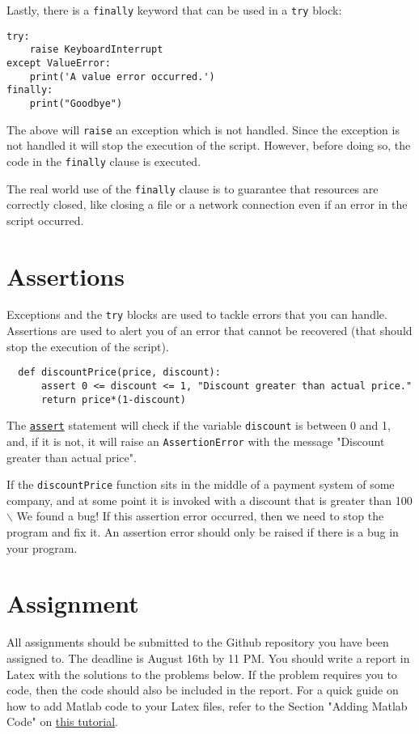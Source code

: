 \documentclass[12pt, a4paper]{article}
\begin{document}
Lastly, there is a \texttt{finally} keyword that can be used in a \texttt{try} block:
\lstset{language=jupyter-python,label= ,caption= ,captionpos=b,numbers=none}
\begin{lstlisting}
try:
    raise KeyboardInterrupt
except ValueError:
    print('A value error occurred.')
finally:
    print("Goodbye")
\end{lstlisting}

The above will \texttt{raise} an exception which is not handled.
Since the exception is not handled it will stop the execution of the script.
However, before doing so, the code in the \texttt{finally} clause is executed.

The real world use of the \texttt{finally} clause is to guarantee that resources are correctly closed, like closing a file or a network connection even if an error in the script occurred.
\section{Assertions}
\label{sec:org393f5d4}
Exceptions and the \texttt{try} blocks are used to tackle errors that you can handle.
Assertions are used to alert you of an error that cannot be recovered (that should stop the execution of the script).
\lstset{language=Python,label= ,caption= ,captionpos=b,numbers=none}
\begin{lstlisting}
  def discountPrice(price, discount):
      assert 0 <= discount <= 1, "Discount greater than actual price."
      return price*(1-discount)
\end{lstlisting}
The \href{https://docs.python.org/3.6/reference/simple\_stmts.html\#the-assert-statement}{\texttt{assert}} statement will check if the variable \texttt{discount} is between 0 and 1, and, if it is not, it will raise an \texttt{AssertionError} with the message "Discount greater than actual price".

If the \texttt{discountPrice} function sits in the middle of a payment system of some company, and at some point it is invoked with a discount that is greater than 100$\backslash$%
We found a bug!
If this assertion error occurred, then we need to stop the program and fix it.
An assertion error should only be raised if there is a bug in your program.
\section{Assignment}
\label{sec:org967c6c0}
All assignments should be submitted to the Github repository you have been assigned to.
The deadline is August 16th by 11 PM.
You should write a report in Latex with the solutions to the problems below.
If the problem requires you to code, then the code should also be included in the report.
For a quick guide on how to add Matlab code to your Latex files, refer to the Section "Adding Matlab Code" on \href{https://guilhermesalome.com/teaching/2018-empirical-methods-in-financial-econometrics/posts/lecture-1-latex.html\#org61c35bc}{this tutorial}.
\end{document}
